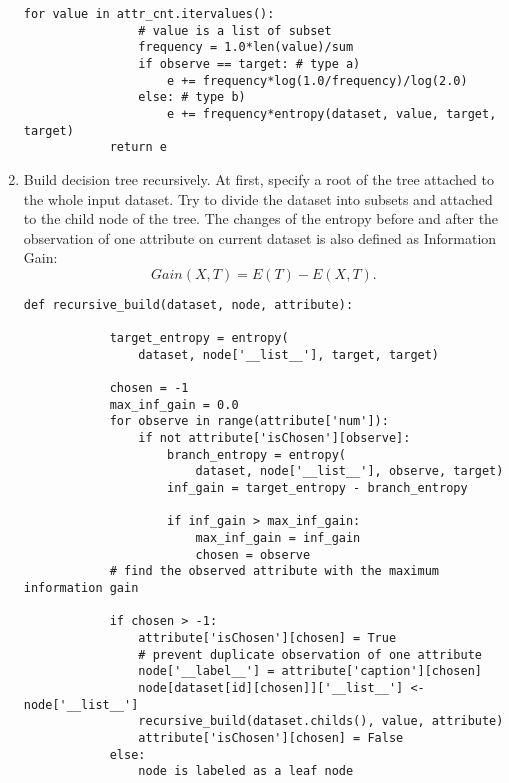 \documentclass[12pt,letterpaper]{article}
\begin{document}
\begin{enumerate}
\begin{lstlisting}[style = Python]
            for value in attr_cnt.itervalues(): 
                # value is a list of subset
                frequency = 1.0*len(value)/sum
                if observe == target: # type a)
                    e += frequency*log(1.0/frequency)/log(2.0) 
                else: # type b)
                    e += frequency*entropy(dataset, value, target, target) 
            return e
    \end{lstlisting}

  \item Build decision tree recursively.  
  At first, specify a root of the tree attached to the whole input dataset.  Try to divide the dataset into subsets and attached to the child node of the tree.  The changes of the entropy before and after the observation of one attribute on current dataset is also defined as Information Gain:
    \begin{equation*}
        Gain(X,T)=E(T)-E(X,T).
    \end{equation*}

     \begin{lstlisting}[style = Python]
        def recursive_build(dataset, node, attribute):

            target_entropy = entropy(
                dataset, node['__list__'], target, target)

            chosen = -1
            max_inf_gain = 0.0
            for observe in range(attribute['num']):
                if not attribute['isChosen'][observe]:
                    branch_entropy = entropy(
                        dataset, node['__list__'], observe, target)
                    inf_gain = target_entropy - branch_entropy

                    if inf_gain > max_inf_gain:
                        max_inf_gain = inf_gain
                        chosen = observe
            # find the observed attribute with the maximum information gain

            if chosen > -1:
                attribute['isChosen'][chosen] = True 
                # prevent duplicate observation of one attribute
                node['__label__'] = attribute['caption'][chosen]
                node[dataset[id][chosen]]['__list__'] <- node['__list__']
                recursive_build(dataset.childs(), value, attribute)
                attribute['isChosen'][chosen] = False
            else:
                node is labeled as a leaf node
    \end{lstlisting}


\end{enumerate}
\end{document}
